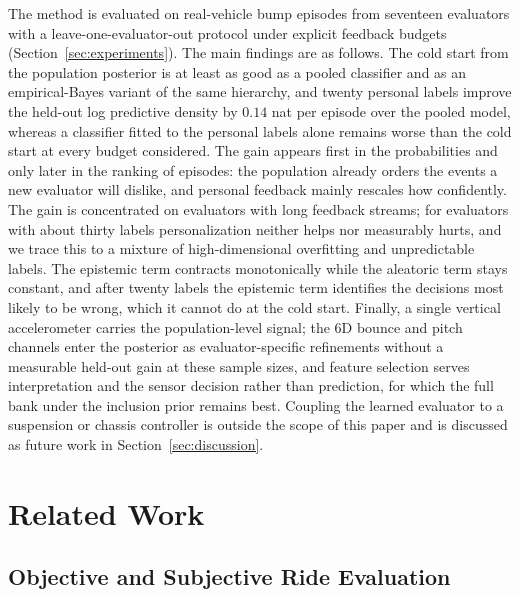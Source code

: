 \documentclass[lettersize,journal]{IEEEtran}
\begin{document}
The method is evaluated on real-vehicle bump episodes from seventeen evaluators with a leave-one-evaluator-out protocol under explicit feedback budgets (Section~\ref{sec:experiments}). The main findings are as follows. The cold start from the population posterior is at least as good as a pooled classifier and as an empirical-Bayes variant of the same hierarchy, and twenty personal labels improve the held-out log predictive density by $0.14$ nat per episode over the pooled model, whereas a classifier fitted to the personal labels alone remains worse than the cold start at every budget considered. The gain appears first in the probabilities and only later in the ranking of episodes: the population already orders the events a new evaluator will dislike, and personal feedback mainly rescales how confidently. The gain is concentrated on evaluators with long feedback streams; for evaluators with about thirty labels personalization neither helps nor measurably hurts, and we trace this to a mixture of high-dimensional overfitting and unpredictable labels. The epistemic term contracts monotonically while the aleatoric term stays constant, and after twenty labels the epistemic term identifies the decisions most likely to be wrong, which it cannot do at the cold start. Finally, a single vertical accelerometer carries the population-level signal; the 6D bounce and pitch channels enter the posterior as evaluator-specific refinements without a measurable held-out gain at these sample sizes, and feature selection serves interpretation and the sensor decision rather than prediction, for which the full bank under the inclusion prior remains best. Coupling the learned evaluator to a suspension or chassis controller is outside the scope of this paper and is discussed as future work in Section~\ref{sec:discussion}.

\section{Related Work}
\label{sec:related}

\subsection{Objective and Subjective Ride Evaluation}
\end{document}
